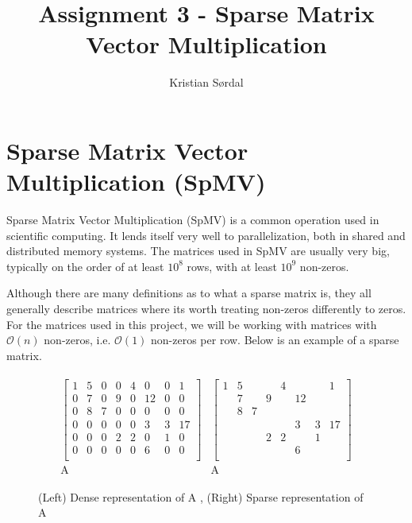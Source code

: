\documentclass{article}
\title{Assignment 3 - Sparse Matrix Vector Multiplication}
\author{Kristian Sørdal}
\begin{document}
\maketitle
\newpage
\tableofcontents
\newpage
    \section{Sparse Matrix Vector Multiplication (SpMV)}
    Sparse Matrix Vector Multiplication (SpMV) is a common operation used in scientific computing. It lends itself very well to parallelization, both in shared and distributed memory systems. The matrices used in SpMV are usually very big, typically on the order of at least \( 10^{8} \) rows, with at least \( 10^{9} \) non-zeros.
    \medskip

    Although there are many definitions as to what a sparse matrix is, they all generally describe matrices where its worth treating non-zeros differently to zeros. For the matrices used in this project, we will be working with matrices with \( \mathcal{O}\left(n\right) \) non-zeros, i.e. \( \mathcal{O}\left(1\right) \) non-zeros per row. Below is an example of a sparse matrix.

    \begin{figure}[H]
        \begin{center}
\begin{align*}
\begin{array}{cc}
    \begin{bmatrix}
         1&5&0&0&4&0&0&1  \\
         0&7&0&9&0&12&0&0  \\
         0&8&7&0&0&0&0&0  \\
         0&0&0&0&0&3&3&17  \\
         0&0&0&2&2&0&1&0  \\
         0&0&0&0&0&6&0&0  \\
    \end{bmatrix}
    &
    \begin{bmatrix}
         1&5&&&4&&&1  \\
         &7&&9&&12&&  \\
         &8&7&&&&&  \\
         &&&&&3&3&17  \\
         &&&2&2&&1&  \\
         &&&&&6&&  \\
    \end{bmatrix} \\
    \text{A} & \text{A}
\end{array}
\end{align*}
        \end{center}
        \caption{(Left) Dense representation of A , (Right) Sparse representation of A} %
    \end{figure}
\end{document}

